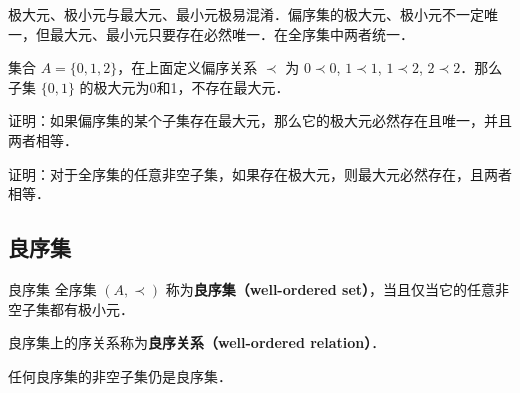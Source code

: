 极大元、极小元与最大元、最小元极易混淆．偏序集的极大元、极小元不一定唯一，但最大元、最小元只要存在必然唯一．在全序集中两者统一．

\begin{example}{}
集合 $A=\{0,1,2\}$，在上面定义偏序关系 $\prec$ 为 $0\prec 0$, $1\prec 1$, $1\prec 2$, $2\prec 2$．那么子集 $\{0,1\}$ 的极大元为0和1，不存在最大元．
\end{example}

\begin{exercise}{}
证明：如果偏序集的某个子集存在最大元，那么它的极大元必然存在且唯一，并且两者相等．
\end{exercise}

\begin{exercise}{}
证明：对于全序集的任意非空子集，如果存在极大元，则最大元必然存在，且两者相等．
\end{exercise}

\subsection{良序集}

\begin{definition}{良序集}
全序集 $(A,\prec)$ 称为\textbf{良序集（well-ordered set）}，当且仅当它的任意非空子集都有极小元．
\end{definition}

良序集上的序关系称为\textbf{良序关系（well-ordered relation）}．

任何良序集的非空子集仍是良序集．